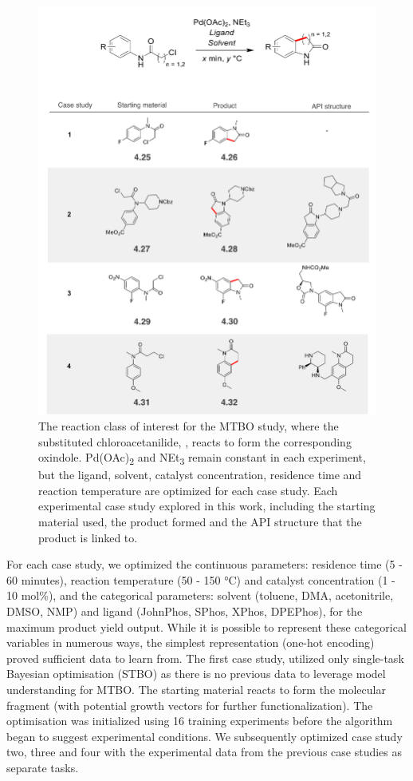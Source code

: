 \begin{figure}
    \centering
    \includegraphics[width=\textwidth]{gfx/Chapter04/ch_activation_case_studies.png}
    \caption{ The reaction class of interest for the MTBO study, where the substituted chloroacetanilide, , reacts to form the corresponding oxindole. Pd(OAc)\textsubscript{2} and NEt\textsubscript{3} remain constant in each experiment, but the ligand, solvent, catalyst concentration, residence time and reaction temperature are optimized for each case study. Each experimental case study explored in this work, including the starting material used, the product formed and the API structure that the product is linked to.}
    \label{fig:ch_activation}
\end{figure}

For each case study, we optimized the continuous parameters: residence time (5 - 60 minutes), reaction temperature (50 - 150 °C) and catalyst concentration (1 - 10 mol\%), and the categorical parameters: solvent (toluene, DMA, acetonitrile, DMSO, NMP) and ligand (JohnPhos, SPhos, XPhos, DPEPhos), for the maximum product yield output. While it is possible to represent these categorical variables in numerous ways, the simplest representation (one-hot encoding) proved sufficient data to learn from. The first case study, utilized only single-task Bayesian optimisation (STBO) as there is no previous data to leverage model understanding for MTBO. The starting material reacts to form the molecular fragment (with potential growth vectors for further functionalization). The optimisation was initialized using 16 training experiments before the algorithm began to suggest experimental conditions. We subsequently optimized case study two, three and four with the experimental data from the previous case studies as separate tasks.

